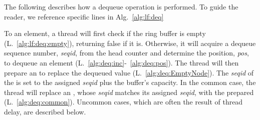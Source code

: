 The following describes how a dequeue operation is performed. %
To guide the reader, we reference specific lines in Alg.~\ref{alg:lf:deq}

To  an element, a thread will first check if the ring buffer is empty (L.~\ref{alg:lf:deq:empty}), returning false if it is.
Otherwise, it will acquire a dequeue sequence number, \emph{seqid}, from the head counter and determine the position, \emph{pos}, to dequeue an element (L.~\ref{alg:deq:inc}-~\ref{alg:deq:pos}).
The thread will then prepare an  to replace the dequeued value (L.~\ref{alg:deq:EmptyNode}). %
The \emph{seqid} of the  is set to the assigned \emph{seqid} plus the buffer's capacity.
In the common case,  the thread will replace an , whose \emph{seqid} matches its assigned \emph{seqid}, with the prepared  (L.~\ref{alg:deq:common}).
Uncommon cases, which are often the result of thread delay, are described below.



